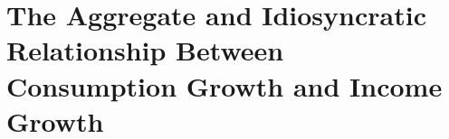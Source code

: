 \documentclass[BufferStockTheory]{subfiles}
\begin{document}
\begin{comment}
\hypertarget{dcgdxneg}{}
\subsection{Is Expected Consumption Growth a Declining Function of $\mRat_{t}$?}
\label{subsec:dcgdxneg}

Figure~\ref{fig:cGroTargetFig} depicts the expected consumption growth factor as a strictly
declining function of the cash-on-hand ratio. To investigate this,
define
\begin{align*}
  \pmb{\Upsilon}(\mRat_{t})  & \equiv  \PGro_{t+1} \usual{\cFunc}(\Rnorm_{t+1}\aFunc(\mRat_{t})+\tShkAll_{t+1})/\usual{\cFunc}(\mRat_{t})  = \cLevBF_{t+1}/\cLevBF_{t}
\end{align*}
and the proposition in which we are interested is
\begin{align*}
  (d/d\mRat_{t})\Ex_{t}[\underbrace{\pmb{\Upsilon}(\mRat_{t})}_{\equiv \pmb{\Upsilon}_{t+1}}]  & < 0  
\end{align*}
or differentiating through the expectations operator, what we want is
\begin{align}
  \Ex_{t}\left[\PGro_{t+1} \left(\frac{\usual{\cFunc}^{\prime}(\mRat_{t+1})\Rnorm_{t+1}\aFunc^{\prime}(\mRat_{t})\usual{\cFunc}(\mRat_{t})-\usual{\cFunc}(\mRat_{t+1})\usual{\cFunc}^{\prime}(\mRat_{t})}{\usual{\cFunc}(\mRat_{t})^{2}}\right)\right]  & < 0 \label{eq:kappaPrimeLT0}.
\end{align}

Appendix~\ref{sec:ApndxCGrowthDeclines} shows that the proposition holds true if there are only transitory (and no permanent) shocks.  The software archive associated with this paper contains an example in which exotic interactions between permanent shocks and extreme curvature that occurs with very small $\pZero$ generate a (small) region where the proposition does not hold.  In practice, for plausible parametric choices (and in models without an artificial liquidity constraint), $\Ex_{t}[\pmb{\Upsilon}_{t+1}^{\prime}]<0$ should generally hold.

\end{comment}

\hypertarget{The-Aggregate-and-Idiosyncratic-Relationship-Between-Consumption-Growth-and-Income-Growth}{}
\section{The Aggregate and Idiosyncratic Relationship Between
  Consumption Growth and Income Growth}
\end{document}

